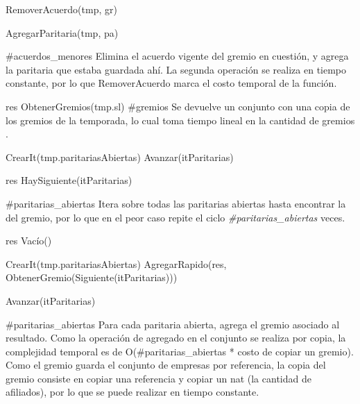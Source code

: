 {
	\state {} \asig RemoverAcuerdo(tmp, gr)			

	\state AgregarParitaria(tmp, pa)									
}
{\#acuerdos\_menores}
{ Elimina el acuerdo vigente del gremio en cuesti\'on, y agrega la paritaria que estaba guardada ah\'i. La segunda operaci\'on se realiza en tiempo constante, por lo que RemoverAcuerdo marca el costo temporal de la funci\'on.}

{
	\state res \asig ObtenerGremios(tmp.sl) 
}
{\#gremios}
{ Se devuelve un conjunto con una copia de los gremios de la temporada, lo cual toma tiempo lineal en la cantidad de gremios . }

{
	\state {} \asig CrearIt(tmp.paritariasAbiertas)		
			
		\state
		\state Avanzar(itParitarias)				
	\endwhile
	\state

	\state res \asig HaySiguiente(itParitarias)		
}
{\#paritarias\_abiertas}
{ Itera sobre todas las paritarias abiertas hasta encontrar la del gremio, por lo que en el peor caso repite el ciclo \emph{\#paritarias\_abiertas} veces. }

{
	\state res \asig Vac\'io()		
	\state

	\state {} \asig CrearIt(tmp.paritariasAbiertas)		
											
		\state
		\state AgregarRapido(res, ObtenerGremio(Siguiente(itParitarias)))			
		
		\state
		\state Avanzar(itParitarias)										
	\endwhile
}
{\#paritarias\_abiertas}
{ Para cada paritaria abierta, agrega el gremio asociado al resultado. Como la operaci\'on de agregado en el conjunto se realiza por copia, la complejidad temporal es de O(\#paritarias\_abiertas * costo de copiar un gremio). Como el gremio guarda el conjunto de empresas por referencia, la copia del gremio consiste en copiar una referencia y copiar un nat (la cantidad de afiliados), por lo que se puede realizar en tiempo constante. }

